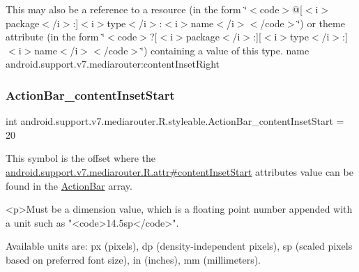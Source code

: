 This may also be a reference to a resource (in the form \char`\"{}$<$code$>$@\mbox{[}$<$i$>$package$<$/i$>$\+:\mbox{]}$<$i$>$type$<$/i$>$\+:$<$i$>$name$<$/i$>$$<$/code$>$\char`\"{}) or theme attribute (in the form \char`\"{}$<$code$>$?\mbox{[}$<$i$>$package$<$/i$>$\+:\mbox{]}\mbox{[}$<$i$>$type$<$/i$>$\+:\mbox{]}$<$i$>$name$<$/i$>$$<$/code$>$\char`\"{}) containing a value of this type.  name android.\+support.\+v7.\+mediarouter\+:content\+Inset\+Right \mbox{\label{classandroid_1_1support_1_1v7_1_1mediarouter_1_1R_1_1styleable_a16470c607bc14ed7d7bba8a623075442}} 
\subsubsection{\texorpdfstring{Action\+Bar\+\_\+content\+Inset\+Start}{ActionBar\_contentInsetStart}}
{\footnotesize\ttfamily int android.\+support.\+v7.\+mediarouter.\+R.\+styleable.\+Action\+Bar\+\_\+content\+Inset\+Start = 20\hspace{0.3cm}{\ttfamily [static]}}

This symbol is the offset where the \hyperlink{classandroid_1_1support_1_1v7_1_1mediarouter_1_1R_1_1attr_a26b877aa26d7c68054fe041baffc1882}{android.\+support.\+v7.\+mediarouter.\+R.\+attr\#content\+Inset\+Start} attribute\textquotesingle{}s value can be found in the \hyperlink{classandroid_1_1support_1_1v7_1_1mediarouter_1_1R_1_1styleable_adc4d3c0d096085367f12d025007aa53f}{Action\+Bar} array.

\begin{DoxyVerb}      <p>Must be a dimension value, which is a floating point number appended with a unit such as "<code>14.5sp</code>".
\end{DoxyVerb}
 Available units are\+: px (pixels), dp (density-\/independent pixels), sp (scaled pixels based on preferred font size), in (inches), mm (millimeters). 

